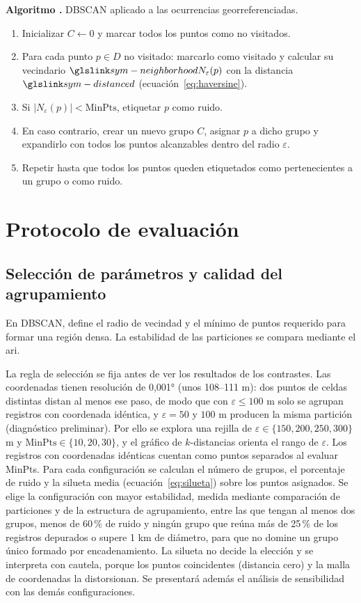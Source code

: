 \label{alg:dbscan}
\noindent\textbf{Algoritmo \thealgoritmo.} DBSCAN aplicado a las ocurrencias georreferenciadas.
\begin{enumerate}
  \item Inicializar $C \gets 0$ y marcar todos los puntos como no visitados.
  \item Para cada punto $p \in D$ no visitado: marcarlo como visitado y calcular su vecindario $\symref{sym-neighborhood}{N_{\varepsilon}(p)}$ con la distancia $\symref{sym-distance}{d}$ (ecuación~\ref{eq:haversine}).
  \item Si $|N_{\varepsilon}(p)| < \mathrm{MinPts}$, etiquetar $p$ como ruido.
  \item En caso contrario, crear un nuevo grupo $C$, asignar $p$ a dicho grupo y expandirlo con todos los puntos alcanzables dentro del radio $\varepsilon$.
  \item Repetir hasta que todos los puntos queden etiquetados como pertenecientes a un grupo o como ruido.
\end{enumerate}

\section{Protocolo de evaluación}

\subsection{Selección de parámetros y calidad del agrupamiento}
\label{sec:parametros}

En DBSCAN,  define el radio de vecindad y  el mínimo de puntos requerido para formar una región densa.
La estabilidad de las particiones se compara mediante el \gls{ari}.

La regla de selección se fija antes de ver los resultados de los contrastes. Las coordenadas tienen resolución de 0,001° (unos 108--111 m): dos puntos de celdas distintas distan al menos ese paso, de modo que con $\varepsilon \leq 100$ m solo se agrupan registros con coordenada idéntica, y $\varepsilon = 50$ y $100$ m producen la misma partición (diagnóstico preliminar). Por ello se explora una rejilla de $\varepsilon \in \{150, 200, 250, 300\}$ m y $\mathrm{MinPts} \in \{10, 20, 30\}$, y el gráfico de $k$-distancias orienta el rango de $\varepsilon$. Los registros con coordenadas idénticas cuentan como puntos separados al evaluar MinPts. Para cada configuración se calculan el número de grupos, el porcentaje de ruido y la silueta media (ecuación~\ref{eq:silueta}) sobre los puntos asignados. Se elige la configuración con mayor estabilidad, medida mediante comparación de particiones y de la estructura de agrupamiento, entre las que tengan al menos dos grupos, menos de 60\,\% de ruido y ningún grupo que reúna más de 25\,\% de los registros depurados o supere 1 km de diámetro, para que no domine un grupo único formado por encadenamiento. La silueta no decide la elección y se interpreta con cautela, porque los puntos coincidentes (distancia cero) y la malla de coordenadas la distorsionan. Se presentará además el análisis de sensibilidad con las demás configuraciones.

